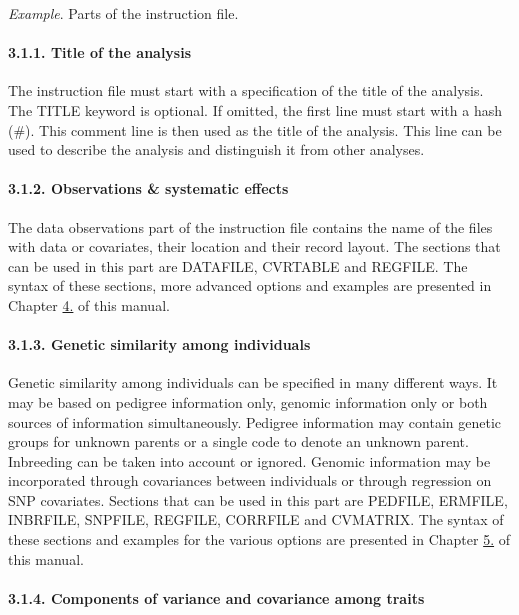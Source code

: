 \emph{Example}. Parts of the instruction file.

\paragraph{3.1.1. Title of the analysis}\label{Inst03}

The instruction file must start with a specification of the title of the
analysis. The TITLE keyword is optional. If omitted, the first line must
start with a hash (\#). This comment line is then used as the title of
the analysis. This line can be used to describe the analysis and
distinguish it from other analyses.

\paragraph{3.1.2. Observations \& systematic effects}\label{Inst04}

The data observations part of the instruction file contains the name of
the files with data or covariates, their location and their record
layout. The sections that can be used in this part are DATAFILE,
CVRTABLE and REGFILE. The syntax of these sections, more advanced
options and examples are presented in Chapter \hyperref[Obse01]{4.} of
this manual.

\paragraph{3.1.3. Genetic similarity among individuals}\label{Inst05}

Genetic similarity among individuals can be specified in many different
ways. It may be based on pedigree information only, genomic information
only or both sources of information simultaneously. Pedigree information
may contain genetic groups for unknown parents or a single code to
denote an unknown parent. Inbreeding can be taken into account or
ignored. Genomic information may be incorporated through covariances
between individuals or through regression on SNP covariates. Sections
that can be used in this part are PEDFILE, ERMFILE, INBRFILE, SNPFILE,
REGFILE, CORRFILE and CVMATRIX. The syntax of these sections and
examples for the various options are presented in Chapter
\hyperref[Gene01]{5.} of this manual.

\paragraph{3.1.4. Components of variance and covariance among
traits}\label{Inst06}


